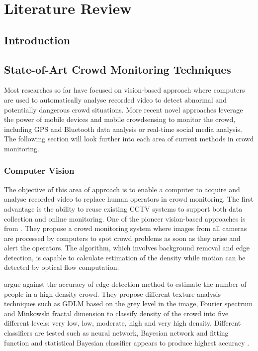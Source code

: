 \chapter{Literature Review}
\label{ch:litReview}
\ifpdf
    \graphicspath{{Chapter2/Figs/Raster/}{Chapter2/Figs/PDF/}{Chapter2/Figs/}}
\else
    \graphicspath{{Chapter2/Figs/Vector/}{Chapter2/Figs/}}
\fi

\section{Introduction}

\section{State-of-Art Crowd Monitoring Techniques}
Most researches so far have focused on vision-based approach where computers are used to automatically analyse recorded video to detect abnormal and potentially dangerous crowd situations. More recent novel approaches leverage the power of mobile devices and mobile crowdsensing to monitor the crowd, including GPS and Bluetooth data analysis or real-time social media analysis. The following section will look further into each area of current methods in crowd monitoring. 

\subsection{Computer Vision}
The objective of this area of approach is to enable a computer to acquire and analyse recorded video to replace human operators in crowd monitoring. The first advantage is the ability to reuse existing CCTV systems to support both data collection and online monitoring. One of the pioneer vision-based approaches is from \citet{Davies1995}. They propose a crowd monitoring system where images from all cameras are processed by computers to spot crowd problems as soon as they arise and alert the operators. The algorithm, which involves background removal and edge detection, is capable to calculate estimation of the density while motion can be detected by optical flow computation.

\citet{Marana1997} argue against the accuracy of edge detection method to estimate the number of people in a high density crowd. They propose different texture analysis techniques such as GDLM based on the grey level in the image, Fourier spectrum and Minkowski fractal dimension \citep{Marana1999} to classify density of the crowd into five different levels: very low, low, moderate, high and very high density. Different classifiers are tested such as neural network, Bayesian network and fitting function and statistical Bayesian classifier appears to produce highest accuracy \citep{Marana1998}.

